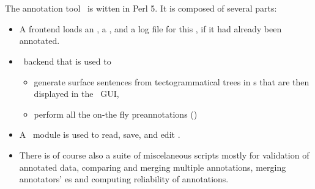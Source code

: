 \section{\seman}
\label{sec:seman}
The annotation tool \seman\ is witten in Perl 5. It is composed of several parts:
\begin{itemize}
\item A frontend loads an \sf, a \semlex,  and a log file for this \sf, if it had already been annotated. 
\item \ntred\ backend that is used to 
	\begin{itemize}
	\item generate surface sentences from tectogrammatical trees in \tf{}s that are then displayed in the \seman\ GUI,
	\item perform all the on-the fly preannotations ()
	\end{itemize}
\item A \semlex\ module is used to read, save, and edit \semlex.
\item There is of course also a suite of miscelaneous scripts mostly for validation of annotated data, comparing and merging multiple annotations, merging annotators' \semlex{}es and computing reliability of annotations.
\end{itemize}

